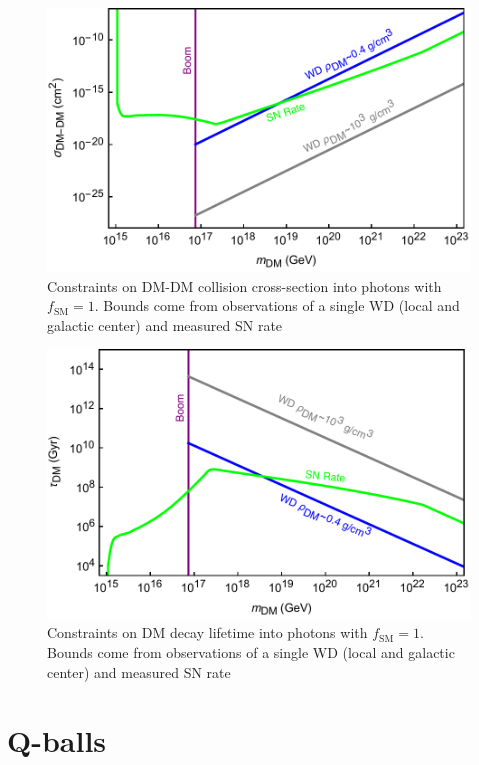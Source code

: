 \documentclass[twocolumn, preprintnumbers,amsmath,amssymb,prd, superscriptaddress]{revtex4}
\begin{document}
\begin{figure}
\includegraphics[scale=.45]{collisionobservation.pdf}
\caption{Constraints on DM-DM collision cross-section into photons with $f_\text{SM} =1$. Bounds come from observations of a single WD (local and galactic center) and measured SN rate}
\label{fig:collisionclasses}
\end{figure}

\begin{figure}
\includegraphics[scale=.45]{decayobservation.pdf}
\caption{Constraints on DM decay lifetime into photons with $f_\text{SM} =1$. Bounds come from observations of a single WD (local and galactic center) and measured SN rate}
\label{fig:decayclasses}
\end{figure}

\section{Q-balls}
\label{sec:QBalls}
\end{document}
